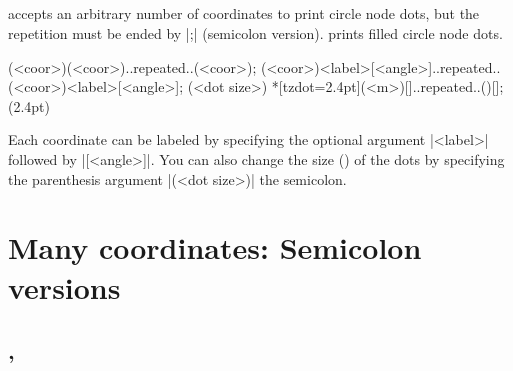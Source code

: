 \subsection{\protect\cmd{\tzdots(*)}}
\label{ssi:tzdots}

\icmd{\tzdots} accepts an arbitrary number of coordinates to print circle node dots, but the repetition must be ended by |;| (semicolon version).
\icmd{\tzdots*} prints filled circle node dots.

\begin{tzdef}
\tzdots*(<coor>)(<coor>)..repeated..(<coor>);
\tzdots*[<opt>](<coor>){<label>}[<angle>]..repeated..
               (<coor>){<label>}[<angle>]; (<dot size>)
 *[tzdot=2.4pt](<m>){}[]..repeated..(){}[]; (2.4pt)
\end{tzdef}


\begin{tzcode}{.3}
\end{tzcode}

Each coordinate can be labeled by specifying the optional argument |{<label>}| followed by |[<angle>]|. You can also change the size () of the dots by specifying the  parenthesis argument |(<dot size>)|  the semicolon.

\begin{tzcode}{.3}
\end{tzcode}


\section{Many coordinates: Semicolon versions}
\label{si:manycoordinates}

\subsection{\protect\cmd{\tzcoors}, \protect\cmd{\tzcoors*}}
\label{ssi:tzcoors}

